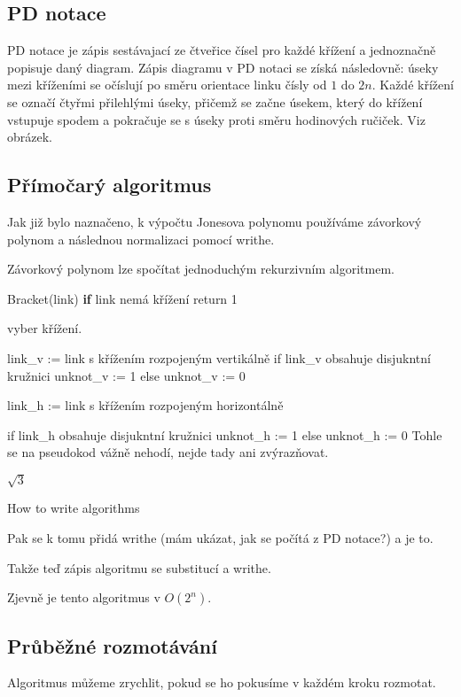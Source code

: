 \subsection{PD notace} 

PD notace je zápis sestávajací ze čtveřice čísel pro každé křížení a jednoznačně popisuje daný diagram. Zápis diagramu v PD notaci se získá následovně: úseky mezi kříženími se očíslují po směru orientace linku čísly od $1$ do $2 n$. Každé křížení se označí čtyřmi přilehlými úseky, přičemž se začne úsekem, který do křížení vstupuje spodem a pokračuje se s úseky proti směru hodinových ručiček. Viz obrázek.

\subsection{Přímočarý algoritmus}

Jak již bylo naznačeno, k výpočtu Jonesova polynomu používáme závorkový polynom a následnou normalizaci pomocí writhe.

Závorkový polynom lze spočítat jednoduchým rekurzivním algoritmem.

\begin{code}
Bracket(link)
   \textbf{if} link nemá křížení
       return 1
       
   vyber křížení.
   
   link_v := link s křížením rozpojeným vertikálně
   if link_v obsahuje disjukntní kružnici
       unknot_v := 1
   else
       unknot_v := 0
       
   link_h := link s křížením rozpojeným horizontálně
   
   if link_h obsahuje disjukntní kružnici
       unknot_h := 1
   else
       unknot_h := 0
  Tohle se na pseudokod vážně nehodí, nejde tady ani zvýrazňovat.
\end{code}

\begin{algorithm}
$\sqrt{3}$
\caption{How to write algorithms}
\end{algorithm}

Pak se k tomu přidá writhe (mám ukázat, jak se počítá z PD notace?) a je to.

Takže teď zápis algoritmu se substitucí a writhe.

Zjevně je tento algoritmus v $O(2^n)$.

\subsection{Průběžné rozmotávání}
Algoritmus můžeme zrychlit, pokud se ho pokusíme v každém kroku rozmotat. 

